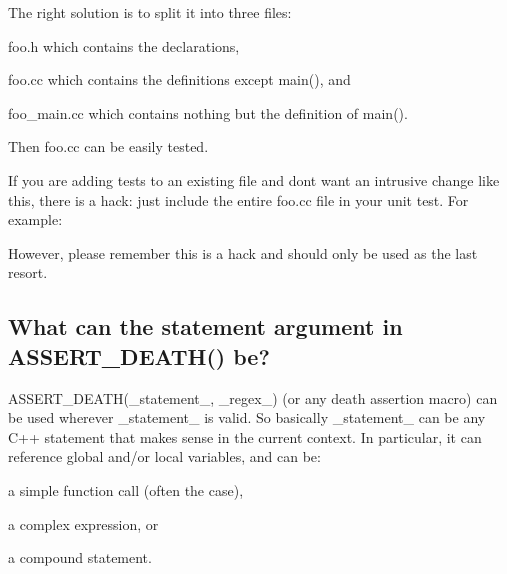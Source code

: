 The right solution is to split it into three files\+:
\begin{DoxyEnumerate}
\item {\ttfamily foo.\+h} which contains the declarations,
\end{DoxyEnumerate}
\begin{DoxyEnumerate}
\item {\ttfamily foo.\+cc} which contains the definitions except {\ttfamily main()}, and
\end{DoxyEnumerate}
\begin{DoxyEnumerate}
\item {\ttfamily foo\+\_\+main.\+cc} which contains nothing but the definition of {\ttfamily main()}.
\end{DoxyEnumerate}

Then {\ttfamily foo.\+cc} can be easily tested.

If you are adding tests to an existing file and don\textquotesingle{}t want an intrusive change like this, there is a hack\+: just include the entire {\ttfamily foo.\+cc} file in your unit test. For example\+: 
\begin{DoxyCode}{0}
\DoxyCodeLine{}
\DoxyCodeLine{}
\DoxyCodeLine{}
\DoxyCodeLine{}
\end{DoxyCode}


However, please remember this is a hack and should only be used as the last resort.

\subsection*{What can the statement argument in A\+S\+S\+E\+R\+T\+\_\+\+D\+E\+A\+T\+H() be?}

{\ttfamily A\+S\+S\+E\+R\+T\+\_\+\+D\+E\+A\+T\+H(\+\_\+statement\+\_\+, \+\_\+regex\+\_\+)} (or any death assertion macro) can be used wherever {\ttfamily \+\_\+statement\+\_\+} is valid. So basically {\ttfamily \+\_\+statement\+\_\+} can be any C++ statement that makes sense in the current context. In particular, it can reference global and/or local variables, and can be\+:
\begin{DoxyItemize}
\item a simple function call (often the case),
\item a complex expression, or
\item a compound statement.
\end{DoxyItemize}

